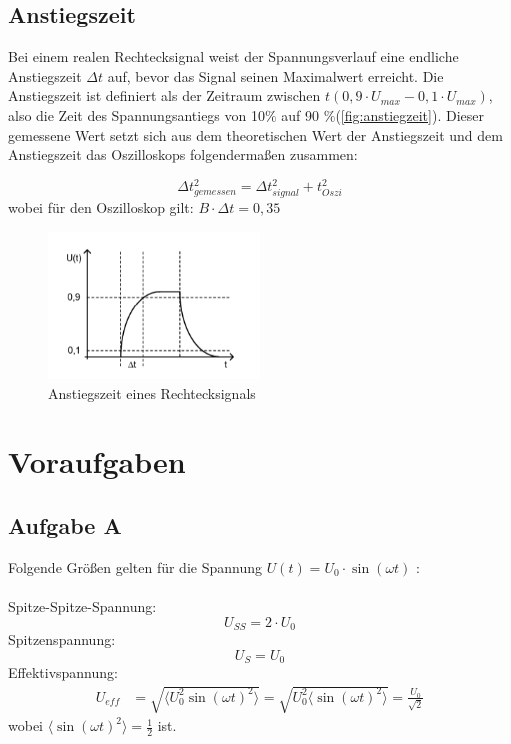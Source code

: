 \documentclass{article}
\begin{document}
\subsection*{Anstiegszeit}
Bei einem realen Rechtecksignal weist der Spannungsverlauf eine endliche Anstiegszeit $\Delta t$
 auf, bevor das Signal seinen Maximalwert erreicht. Die Anstiegszeit ist definiert als der
  Zeitraum zwischen  $t(0,9\cdot U_{max}- 0,1\cdot U_{max})$, also die Zeit des Spannungsantiegs 
  von 10$\%$ auf 90 $\%$(\autoref{fig:anstiegzeit}).
Dieser gemessene Wert setzt sich aus dem theoretischen Wert der Anstiegszeit und dem 
Anstiegszeit das Oszilloskops folgendermaßen zusammen:

\begin{equation}
    \Delta t_{gemessen}^2 = \Delta t_{signal}^2 + t_{Oszi}^2
\end{equation}
wobei für den Oszilloskop gilt: $B \cdot \Delta t = 0,35$
\begin{figure}[H]
    \centering
    \includegraphics[width=0.5\textwidth]{figs/Verusch0_Anstiegszeit.png}
    \caption{Anstiegszeit eines Rechtecksignals\cite{anleitung}}
    \label{fig:anstiegzeit}
\end{figure}
\newpage 

\section{Voraufgaben}

\subsection*{Aufgabe A}
Folgende Größen gelten für die Spannung $U(t)= U_0 \cdot \sin{(\omega t)}$ :\\
\\
Spitze-Spitze-Spannung: \begin{equation}
        U_{SS}= 2 \cdot U_0
    \end{equation}
Spitzenspannung: 
    \begin{equation}
        U_{S}= U_0
    \end{equation}
 Effektivspannung:
    \begin{align*}
        U_{eff} &= \sqrt{ \langle U_0 ^2 \sin{(\omega t)}^2 \rangle}
        = \sqrt{ U_0 ^2 \langle \sin{(\omega t)}^2 \rangle} = \frac{U_0}{\sqrt{2}}
    \end{align*}
wobei $\langle \sin{(\omega t)}^2 \rangle = \frac{1}{2}$ ist.
\end{document}
